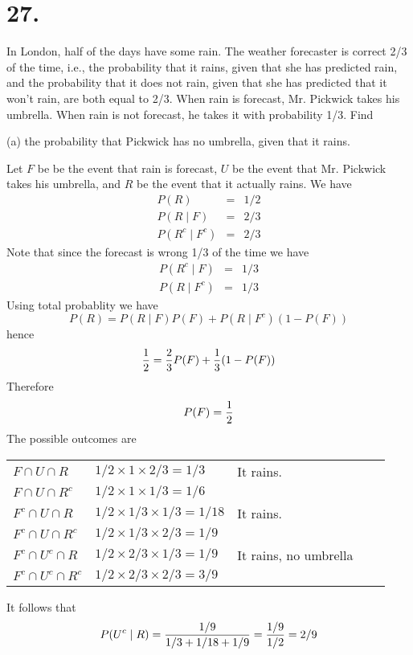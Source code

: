 \section*{27.}
In London, half of the days have some rain. The weather forecaster
is correct 2/3 of the time, i.e., the probability that it rains, given that she has
predicted rain, and the probability that it does not rain, given that she has
predicted that it won't rain, are both equal to 2/3. When rain is forecast,
Mr. Pickwick takes his umbrella. When rain is not forecast, he takes it with
probability 1/3. Find

\bigskip
\noindent
(a) the probability that Pickwick has no umbrella, given that it rains.

\bigskip
\noindent
Let $F$ be be the event that rain is forecast, $U$ be the event that
Mr. Pickwick takes his umbrella, and $R$ be the event that it
actually rains.
We have
\begin{eqnarray*}
P(R)&=&1/2\\
P(R\mid F)&=&2/3\\
P(R^c\mid F^c)&=&2/3
\end{eqnarray*}
Note that since the forecast is wrong 1/3 of the time we have
\begin{eqnarray*}
P(R^c\mid F)&=&1/3\\
P(R\mid F^c)&=&1/3
\end{eqnarray*}
Using total probablity we have
$$P(R)=P(R\mid F)P(F)+P(R\mid F^c)(1-P(F))$$
hence
$${1\over2}={2\over3}P(F)+{1\over3}(1-P(F))$$
Therefore
$$P(F)={1\over2}$$
The possible outcomes are

\bigskip
\noindent
\begin{tabular}{lllll}
$F\cap U\cap R$ & $1/2\times1\times2/3=1/3$ & It rains.\\
$F\cap U\cap R^c$ & $1/2\times1\times1/3=1/6$\\
$F^c\cap U\cap R$ & $1/2\times1/3\times1/3=1/18$ & It rains.\\
$F^c\cap U\cap R^c$ & $1/2\times1/3\times2/3=1/9$\\
$F^c\cap U^c\cap R$ & $1/2\times2/3\times1/3=1/9$ & It rains, no umbrella\\
$F^c\cap U^c\cap R^c$ & $1/2\times2/3\times2/3=3/9$\\
\end{tabular}

\bigskip
\noindent
It follows that
$$P(U^c\mid R)={1/9\over1/3+1/18+1/9}={1/9\over1/2}=2/9$$

